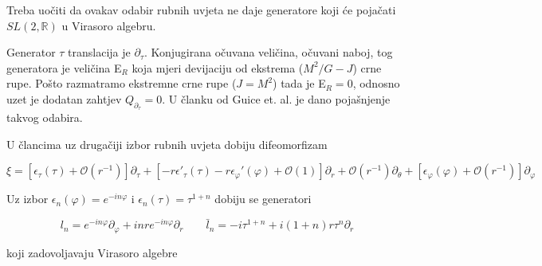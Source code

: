 Treba uočiti da ovakav odabir rubnih uvjeta ne daje generatore koji će pojačati\newline $SL(2,\mathbb{R})$ u Virasoro algebru. 

\noindent Generator $\tau$ translacija je $\partial_\tau$. Konjugirana očuvana veličina, očuvani naboj, tog generatora je veličina E${}_R$ koja mjeri devijaciju  od ekstrema ($M^2/G-J$) crne rupe. Pošto razmatramo ekstremne crne rupe ($J=M^2$) tada je E${}_R=0$, odnosno uzet je dodatan zahtjev $Q_{\partial_\tau}=0$. U članku od Guice et. al.  \citep{Guica:2008mu} je dano pojašnjenje takvog odabira.







\noindent U člancima \citep{Matsuo:2009sj, Matsuo:2009pg} uz drugačiji izbor rubnih uvjeta dobiju difeomorfizam

\begin{equation}
\xi=[\epsilon_\tau(\tau)+\mathcal{O}(r^{-1})]\partial_\tau+[-r\epsilon'_\tau(\tau)-r\epsilon_\varphi'(\varphi)+\mathcal{O}(1)]\partial_r+\mathcal{O}(r^{-1})\partial_\theta+[\epsilon_\varphi(\varphi)+\mathcal{O}(r^{-1})]\partial_\varphi
\end{equation}

\noindent Uz izbor $\epsilon_n(\varphi)=e^{-i n\varphi}$ i $\epsilon_n(\tau)=\tau^{1+n}$ dobiju se generatori

\begin{equation}
l_n=e^{-in\varphi}\partial_\varphi+i nre^{-in\varphi}\partial_r\qquad \bar{l}_n=-i\tau^{1+n}+i(1+n)r\tau^n\partial_r
\end{equation}

\noindent koji zadovoljavaju Virasoro algebre


